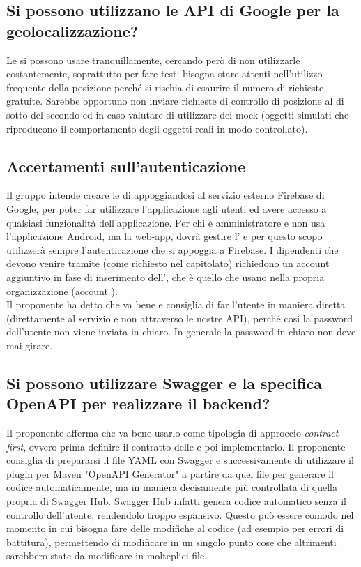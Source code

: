 \subsection{Si possono utilizzano le API di Google per la geolocalizzazione?}
Le si possono usare tranquillamente, cercando però di non utilizzarle costantemente, soprattutto per fare test: bisogna stare attenti nell'utilizzo frequente della posizione perché si rischia di esaurire il numero di richieste gratuite.
Sarebbe opportuno non inviare richieste di controllo di posizione al di sotto del secondo ed in caso valutare di utilizzare dei mock (oggetti simulati che riproducono il comportamento degli oggetti reali in modo controllato).

\subsection{Accertamenti sull'autenticazione}
Il gruppo intende creare le  di  appoggiandosi al servizio esterno Firebase di Google, per poter far utilizzare l'applicazione agli utenti ed avere accesso a qualsiasi funzionalità dell'applicazione.
Per chi è amministratore e non usa l'applicazione Android, ma la web-app, dovrà gestire l' e per questo scopo utilizzerà sempre l'autenticazione che si appoggia a Firebase. I dipendenti che devono venire 
 tramite  (come richiesto nel capitolato) richiedono un account aggiuntivo in fase di inserimento dell', che è quello che usano nella propria organizzazione (account ).\\
Il proponente ha detto che va bene e consiglia di far  l'utente in maniera diretta (direttamente al servizio e non attraverso le nostre API), perché cosi la password dell'utente non viene inviata in chiaro. In generale la password in chiaro non deve mai girare.

\subsection{Si possono utilizzare Swagger e la specifica OpenAPI per realizzare il backend?}
Il proponente afferma che va bene usarlo come tipologia di approccio \textit{contract first}, ovvero prima definire il contratto delle  e poi implementarlo. Il proponente 
consiglia di prepararsi il file YAML con Swagger e successivamente di utilizzare il plugin per Maven "OpenAPI Generator" a partire da quel file per generare il codice automaticamente, ma in maniera decisamente più controllata di quella propria di Swagger Hub.
Swagger Hub infatti genera codice automatico senza il controllo dell'utente, rendendolo troppo espansivo. 
Questo può essere comodo nel momento in cui bisogna fare delle modifiche al codice (ad esempio per errori di battitura), permettendo di modificare in un singolo punto cose che altrimenti sarebbero state da modificare in molteplici file.

